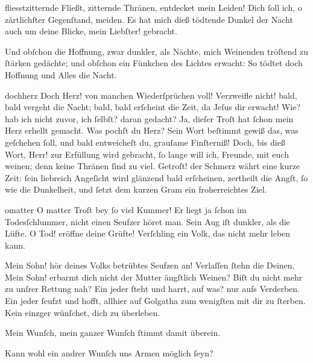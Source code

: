 \documentclass{ees}
\begin{document}
{  \begin{movement}{fliesstzitternde}
    \voice[Johannes]
    Fließt, zitternde Thränen, entdecket mein Leiden!
    Dich ſoll ich, o zärtlichſter Gegenſtand, meiden.
    Es hat mich dieß tödtende Dunkel der Nacht
    auch um deine Blicke, mein Liebſter! gebracht.

    Und obſchon die Hoffnung, zwar dunkler, als Nächte,
    mich Weinenden tröſtend zu ſtärken gedächte;
    und obſchon ein Fünkchen des Lichtes erwacht:
    So tödtet doch Hoffnung und Alles die Nacht.
  \end{movement}

  \begin{movement}{dochherz}
    \voice[Johannes]
    Doch Herz! von manchen Wiederſprüchen voll!
    Verzweifle nicht! bald, bald vergeht die Nacht;
    bald, bald erſcheint die Zeit, da Jeſus dir erwacht!
    Wie? hab ich nicht zuvor, ich ſelbſt? daran gedacht?
    Ja, dieſer Troſt hat ſchon mein Herz erhellt gemacht.
    Was pochſt du Herz? Sein Wort beſtimmt gewiß
    das, was geſchehen ſoll,
    und bald entweicheſt du, grauſame Finſterniß!
    Doch, bis dieß Wort, Herr! zur Erfüllung wird gebracht,
    ſo lange will ich, Freunde, mit euch weinen;
    denn keine Thränen ſind zu viel.
    Getroſt! der Schmerz währt eine kurze Zeit:
    ſein liebreich Angeſicht wird glänzend bald erſcheinen,
    zertheilt die Angſt, ſo wie die Dunkelheit,
    und ſetzt dem kurzen Gram ein froherreichtes Ziel.
  \end{movement}

  \begin{movement}{omatter}
    O matter Troſt bey ſo viel Kummer!
    Er liegt ja ſchon im Todesſchlummer,
    nicht einen Seufzer höret man.
    Sein Aug iſt dunkler, als die Lüfte.
    O Tod! eröffne deine Grüfte!
    Verſchling ein Volk, das nicht mehr leben kann.

    \voice[Maria]
    Mein Sohn! hör deines Volks betrübtes Seufzen an!
    Verlaſſen ſtehn die Deinen.
    Mein Sohn! erbarmt dich nicht der Mutter ängſtlich Weinen?
    Biſt du nicht mehr zu unſrer Rettung nah?
    Ein jeder ſteht und harrt, auf was? nur aufs Verderben.
    Ein jeder ſeufzt und hofft, allhier auf Golgatha
    zum wenigſten mit dir zu ſterben.
    Kein einzger wünſchet, dich zu überleben.

    \voice[Eidli]
    Mein Wunſch, mein ganzer Wunſch ſtimmt damit überein.

    Kann wohl ein andrer Wunſch uns Armen möglich ſeyn?


\end{movement}}
\end{document}
